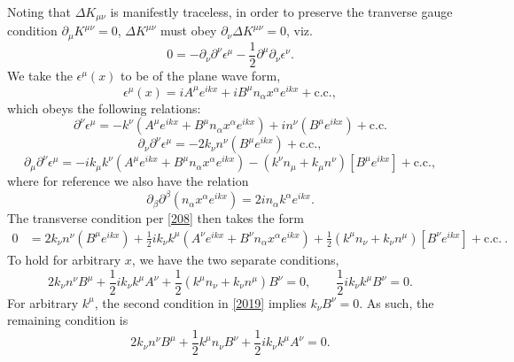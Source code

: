 \documentclass[10pt,letterpaper]{article}
\begin{document}
Noting that $\Delta K_{\mu\nu}$ is manifestly traceless, in order to preserve the tranverse gauge condition $\partial_\mu K^{\mu\nu} = 0$,  $\Delta K^{\mu\nu}$ must obey $\partial_\nu \Delta K^{\mu\nu}=0$, viz.
\begin{equation}
	0 =
	-\partial_\nu \partial^\nu \epsilon^\mu - \frac12 \partial^\mu \partial_\nu \epsilon^\nu .\label{208}
\end{equation}
We take the $\epsilon^\mu(x)$ to be of the plane wave form,
\begin{equation}
\epsilon^\mu(x) = i A^\mu e^{ikx} + iB^\mu n_\alpha x^\alpha e^{ikx} + \text{c.c.},
\end{equation}
which obeys the following relations:
\begin{equation}
\partial^\nu \epsilon^\mu = - k^\nu\left(A^\mu e^{ikx} + B^\mu n_\alpha x^\alpha e^{ikx}\right)+ 
i n^\nu \left(  B^\mu  e^{ikx} \right)+ \text{c.c.}
\end{equation}
\begin{equation}
\partial_\nu \partial^\nu \epsilon^\mu = -2k_\nu n^\nu \left(B^\mu  e^{ikx}\right)+\text{c.c.},
\end{equation}
\begin{equation}
\partial_\mu \partial^\nu \epsilon^\mu = -i k_\mu k^\nu\left(A^\mu e^{ikx} +  B^\mu n_\alpha x^\alpha e^{ikx}\right)
- (k^\nu n_\mu+k_\mu n^\nu)\left[ B^\mu e^{ikx}\right] + \text{c.c.},
\end{equation}
where for reference we also have the relation
\begin{equation}
\partial_\beta \partial^\beta (n_\alpha x^\alpha e^{ikx}) = 2i n_\alpha k^\alpha e^{ikx}.
\end{equation}
The transverse condition per \eqref{208} then takes the form
\begin{align}
0 {}&= 2k_\nu n^\nu \left(B^\mu  e^{ikx}\right)+\frac12 i k_\nu k^\mu\left(A^\nu e^{ikx} +  B^\nu n_\alpha x^\alpha e^{ikx}\right)
+\frac12 (k^\mu n_\nu+k_\nu n^\mu)\left[ B^\nu e^{ikx}\right]+ \text{c.c.}\ .
\end{align}
To hold for arbitrary $x$, we have the two separate conditions,
\begin{equation}
2k_\nu n^\nu B^\mu +\frac12 ik_\nu k^\mu A^\nu + \frac12 (k^\mu n_\nu+k_\nu n^\mu)B^\nu=0,\qquad \frac12 ik_\nu k^\mu B^\nu=0.\label{2019}
\end{equation}
For arbitrary $k^\mu$, the second condition in \ref{2019} implies $k_\nu B^\nu = 0$. As such, the remaining condition is
\begin{equation}
2k_\nu n^\nu B^\mu + \frac12 k^\mu n_\nu B^\nu + \frac12 i k_\nu k^\mu A^\nu = 0.
\end{equation}
\end{document}
